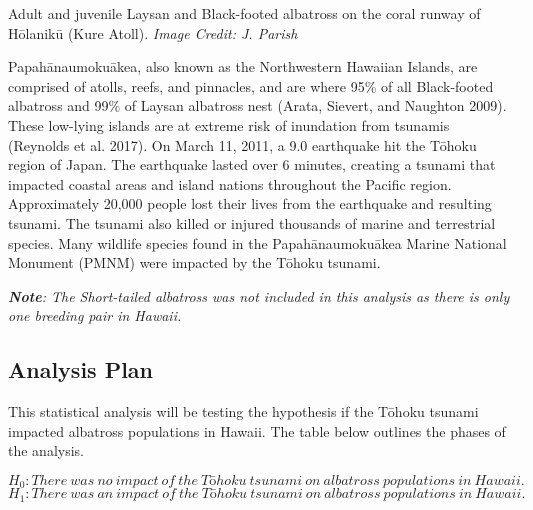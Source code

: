 \documentclass[
]{article}
\begin{document}
Adult and juvenile Laysan and Black-footed albatross on the coral runway
of Hōlanikū (Kure Atoll). \emph{Image Credit: J. Parish}

Papahānaumokuākea, also known as the Northwestern Hawaiian Islands, are
comprised of atolls, reefs, and pinnacles, and are where 95\% of all
Black-footed albatross and 99\% of Laysan albatross nest (Arata,
Sievert, and Naughton 2009). These low-lying islands are at extreme risk
of inundation from tsunamis (Reynolds et al. 2017). On March 11, 2011, a
9.0 earthquake hit the Tōhoku region of Japan. The earthquake lasted
over 6 minutes, creating a tsunami that impacted coastal areas and
island nations throughout the Pacific region. Approximately 20,000
people lost their lives from the earthquake and resulting tsunami. The
tsunami also killed or injured thousands of marine and terrestrial
species. Many wildlife species found in the Papahānaumokuākea Marine
National Monument (PMNM) were impacted by the Tōhoku tsunami.

\emph{\textbf{Note}: The Short-tailed albatross was not included in this
analysis as there is only one breeding pair in Hawaii.}

\hypertarget{analysis-plan}{%
\subsection{Analysis Plan}\label{analysis-plan}}

This statistical analysis will be testing the hypothesis if the Tōhoku
tsunami impacted albatross populations in Hawaii. The table below
outlines the phases of the analysis.

\[H_{0}: There\ was\ no\ impact\ of\ the\ Tōhoku\ tsunami\ on\ albatross\ populations\ in\ Hawaii.\]
\[H_{1}: There\ was\ an\ impact\ of\ the\ Tōhoku\ tsunami\ on\ albatross\ populations\ in\ Hawaii.\]
\end{document}
